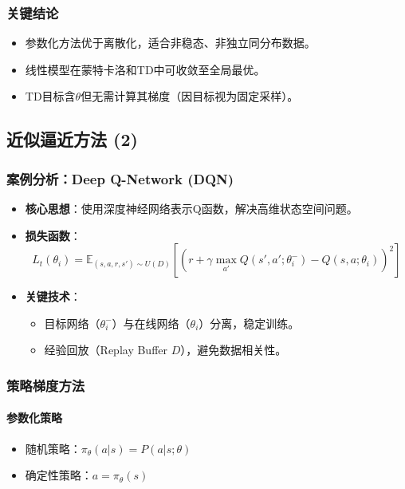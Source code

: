 \subsubsection{关键结论}
\begin{itemize}
    \item 参数化方法优于离散化，适合非稳态、非独立同分布数据。
    \item 线性模型在蒙特卡洛和TD中可收敛至全局最优。
    \item TD目标含$\theta$但无需计算其梯度（因目标视为固定采样）。
\end{itemize}

\subsection{近似逼近方法 (2)}

\subsubsection{案例分析：Deep Q-Network (DQN)}
\begin{itemize}
    \item \textbf{核心思想}：使用深度神经网络表示Q函数，解决高维状态空间问题。
    \item \textbf{损失函数}：
    \[
    L_t(\theta_i) = \mathbb{E}_{(s,a,r,s') \sim U(D)} \left[ \left( r + \gamma \max_{a'} Q(s',a'; \theta_i^-) - Q(s,a; \theta_i) \right)^2 \right]
    \]
    \item \textbf{关键技术}：
    \begin{itemize}
        \item 目标网络（$\theta_i^-$）与在线网络（$\theta_i$）分离，稳定训练。
        \item 经验回放（Replay Buffer $D$），避免数据相关性。
    \end{itemize}
\end{itemize}

\subsubsection{策略梯度方法}
\paragraph{参数化策略}
\begin{itemize}
    \item 随机策略：$\pi_\theta(a|s) = P(a|s; \theta)$
    \item 确定性策略：$a = \pi_\theta(s)$
\end{itemize}

